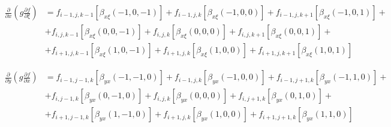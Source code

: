 \begin{equation*}
    \begin{split}
        \frac
            {\partial}
            {\partial x}
        \left(
            g
            \frac
                {\partial f}
                {\partial \xi}
        \right)
        &
        =
        f_{i-1, j, k-1}
        \left[
            \beta_{x\xi} \left(-1, 0, -1\right)
        \right]
        +
        f_{i-1, j, k}
        \left[
            \beta_{x\xi} \left(-1, 0, 0\right)
        \right]
        +
        f_{i-1, j, k+1}
        \left[
            \beta_{x\xi} \left(-1, 0, 1\right)
        \right]
        +
        \\
        &
        +
        f_{i, j, k-1}
        \left[
            \beta_{x\xi} \left(0, 0, -1\right)
        \right]
        +
        f_{i, j, k}
        \left[
            \beta_{x\xi} \left(0, 0, 0\right)
        \right]
        +
        f_{i, j, k+1}
        \left[
            \beta_{x\xi} \left(0, 0, 1\right)
        \right]
        +
        \\
        &
        +
        f_{i+1, j, k-1}
        \left[
            \beta_{x\xi} \left(1, 0, -1\right)
        \right]
        +
        f_{i+1, j, k}
        \left[
            \beta_{x\xi} \left(1, 0, 0\right)
        \right]
        +
        f_{i+1, j, k+1}
        \left[
            \beta_{x\xi} \left(1, 0, 1\right)
        \right]
    \end{split}
\end{equation*}

\begin{equation*}
    \begin{split}
        \frac
            {\partial}
            {\partial y}
        \left(
            g
            \frac
                {\partial f}
                {\partial x}
        \right)
        &
        =
        f_{i-1, j-1, k}
        \left[
            \beta_{yx} \left(-1, -1, 0\right)
        \right]
        +
        f_{i-1, j, k}
        \left[
            \beta_{yx} \left(-1, 0, 0\right)
        \right]
        +
        f_{i-1, j+1, k}
        \left[
            \beta_{yx} \left(-1, 1, 0\right)
        \right]
        +
        \\
        &
        +
        f_{i, j-1, k}
        \left[
            \beta_{yx} \left(0, -1, 0\right)
        \right]
        +
        f_{i, j, k}
        \left[
            \beta_{yx} \left(0, 0, 0\right)
        \right]
        +
        f_{i, j+1, k}
        \left[
            \beta_{yx} \left(0, 1, 0\right)
        \right]
        +
        \\
        &
        +
        f_{i+1, j-1, k}
        \left[
            \beta_{yx} \left(1, -1, 0\right)
        \right]
        +
        f_{i+1, j, k}
        \left[
            \beta_{yx} \left(1, 0, 0\right)
        \right]
        +
        f_{i+1, j+1, k}
        \left[
            \beta_{yx} \left(1, 1, 0\right)
        \right]
    \end{split}
\end{equation*}


